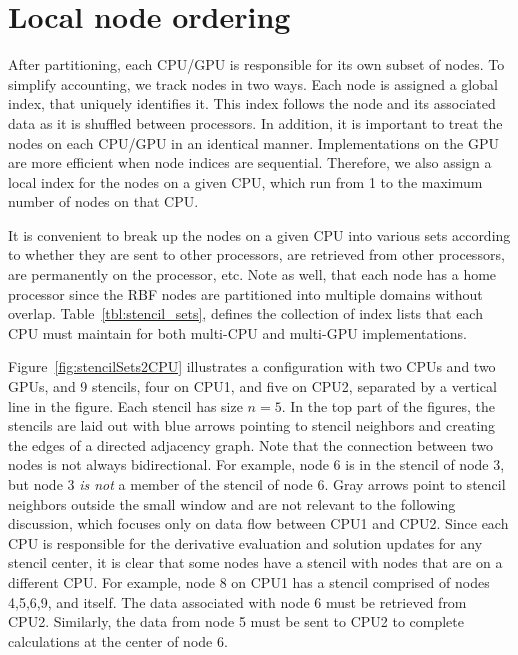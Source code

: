 


\section{Local node ordering}

After partitioning, each CPU/GPU is responsible for its own subset of nodes. 
To simplify accounting, we track nodes in two ways. Each node is assigned
a global index, that uniquely identifies it. This index follows the node 
and its associated data as it is shuffled between processors. In addition, 
it is important to treat the nodes on each CPU/GPU in an identical manner. 
Implementations on the GPU are more efficient when node indices
are sequential. Therefore, we also assign a local index for the nodes on 
a given CPU, which run from 1 to the maximum number of nodes on that CPU. 

It is convenient to break up the nodes on a given CPU into various sets
according to whether they are sent to other processors, are retrieved from 
other processors, are permanently on the processor, etc. Note as well, 
that each node has a home processor since the RBF nodes are partitioned into 
multiple domains without overlap.
Table~\ref{tbl:stencil_sets}, defines the collection of index lists that each CPU must maintain for both multi-CPU and multi-GPU implementations.  


Figure~{\ref{fig:stencilSets2CPU}} illustrates a configuration with two 
CPUs and two GPUs, and 9 stencils, four on CPU1, and five on CPU2, separated
by a vertical line in the figure. Each stencil
has size $n=5$. In the top part of the figures, the stencils are laid out
with blue arrows pointing to stencil neighbors and creating the edges of a directed adjacency graph. Note that the connection between two nodes is not 
always bidirectional. For example, node 6 is in the stencil of node 3, but 
node 3 {\em is not\/} a member of the stencil of node 6. 
Gray arrows point to stencil neighbors outside the small window and are not relevant to the following discussion, which focuses only on data flow between 
CPU1 and CPU2. 
Since each CPU is responsible for the derivative evaluation and solution updates for any stencil center, it is clear that some nodes have a stencil with nodes that are on a different CPU. For example, node 8 on CPU1 has a stencil comprised of
nodes 4,5,6,9, and itself. The data associated with node 6 must be retrieved
from CPU2. Similarly, the data from node 5 must be sent to CPU2 to 
complete calculations at the center of node 6.

